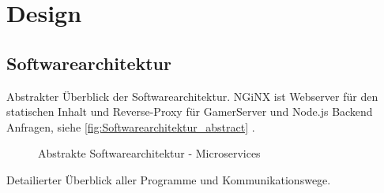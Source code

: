 \documentclass[11pt,ngerman]{article}
\begin{document}


    \section{Design}

    \subsection{Softwarearchitektur}
    Abstrakter Überblick der Softwarearchitektur. \Gls{NGiNX} ist Webserver für den statischen Inhalt und \Gls{Reverse-Proxy} für GamerServer und Node.js Backend Anfragen, siehe \autoref{fig:Softwarearchitektur_abstract} .
        \begin{figure}[H]
        \centering
        \caption{Abstrakte Softwarearchitektur - \Glspl{Microservice}}
        \label{fig:Softwarearchitektur_abstract}
    \end{figure}
    \newpage
    Detailierter Überblick aller Programme und Kommunikationswege.
\end{document}
